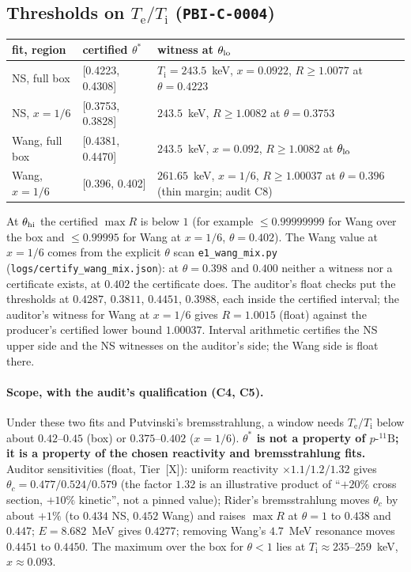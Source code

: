 \documentclass[10pt]{article}
\newcommand{\tier}[1]{\textsf{[#1]}}
\newcommand{\tX}{\tier{X}}
\newcommand{\Te}{T_{\mathrm e}}
\newcommand{\Ti}{T_{\mathrm i}}
\newcommand{\pB}{p\text{-}{}^{11}\mathrm{B}}
\begin{document}
\subsection{Thresholds on $\Te/\Ti$ (\texttt{PBI-C-0004})}
\begin{center}\small\begin{tabular}{p{4.2cm}p{3.0cm}p{6.8cm}}\toprule
fit, region & certified $\theta^\ast$ & witness at $\theta_{\rm lo}$\\\midrule
NS, full box & [0.4223, 0.4308] & $\Ti=243.5$~keV, $x=0.0922$, $R\ge1.0077$ at $\theta=0.4223$\\
NS, $x=1/6$ & [0.3753, 0.3828] & $243.5$~keV, $R\ge1.0082$ at $\theta=0.3753$\\
Wang, full box & [0.4381, 0.4470] & $243.5$~keV, $x=0.092$, $R\ge1.0082$ at $\theta_{\rm lo}$\\
Wang, $x=1/6$ & [0.396, 0.402] & $\mathbf{261.65}$~keV, $x=1/6$, $R\ge1.00037$ at $\theta=0.396$ (thin margin; audit C8)\\\bottomrule
\end{tabular}\end{center}
At $\theta_{\rm hi}$ the certified $\max R$ is below $1$ (for example $\le0.99999999$ for Wang over the box and $\le0.99995$ for Wang at $x=1/6$, $\theta=0.402$). The Wang value at $x=1/6$ comes from the explicit $\theta$ scan \texttt{e1\_wang\_mix.py} (\texttt{logs/certify\_wang\_mix.json}): at $\theta=0.398$ and $0.400$ neither a witness nor a certificate exists, at $0.402$ the certificate does. The auditor's float checks put the thresholds at $0.4287$, $0.3811$, $0.4451$, $0.3988$, each inside the certified interval; the auditor's witness for Wang at $x=1/6$ gives $R=1.0015$ (float) against the producer's certified lower bound $1.00037$. Interval arithmetic certifies the NS upper side and the NS witnesses on the auditor's side; the Wang side is float there.

\paragraph{Scope, with the audit's qualification (C4, C5).} Under these two fits and Putvinski's bremsstrahlung, a window needs $\Te/\Ti$ below about $0.42$--$0.45$ (box) or $0.375$--$0.402$ ($x=1/6$). \textbf{$\theta^\ast$ is not a property of $\pB$; it is a property of the chosen reactivity and bremsstrahlung fits.} Auditor sensitivities (float, Tier~\tX{}): uniform reactivity $\times1.1/1.2/1.32$ gives $\theta_c=0.477/0.524/0.579$ (the factor $1.32$ is an illustrative product of ``$+20\%$ cross section, $+10\%$ kinetic'', not a pinned value); Rider's bremsstrahlung moves $\theta_c$ by about $+1\%$ (to $0.434$ NS, $0.452$ Wang) and raises $\max R$ at $\theta=1$ to $0.438$ and $0.447$; $E=8.682$~MeV gives $0.4277$; removing Wang's $4.7$~MeV resonance moves $0.4451$ to $0.4450$. The maximum over the box for $\theta<1$ lies at $\Ti\approx235$--$259$~keV, $x\approx0.093$.
\end{document}

